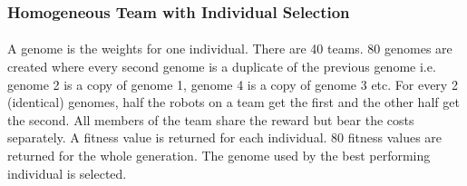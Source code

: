 \documentclass[sigconf]{aamas}  %
\begin{document}
\subsubsection{Homogeneous Team with Individual Selection}

\paragraph{}
A genome is the weights for one individual. There are 40 teams. 80 genomes are created where every second genome is a duplicate of the previous genome i.e. genome 2 is a copy of genome 1, genome 4 is a copy of genome 3 etc. For every 2 (identical) genomes, half the robots on a team get the first and the other half get the second. All members of the team share the reward but bear the costs separately. A fitness value is returned for each individual. 80 fitness values are returned for the whole generation. The genome used by the best performing individual is selected.

\balance  %
\end{document}
